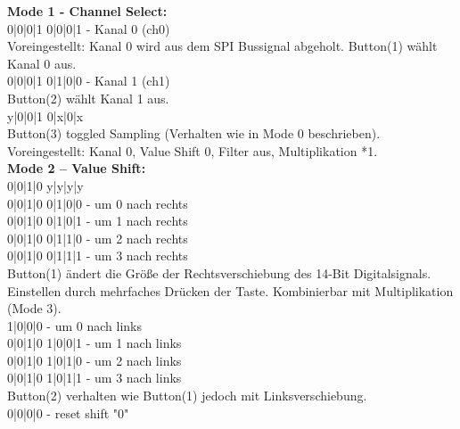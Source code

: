 \noindent \textbf{Mode 1 - Channel Select:}\\
{\color{red} 0}{\color{blue}|0|0|1} {\color{orange} 0|0|0|1} - Kanal 0 (ch0)\\
Voreingestellt: Kanal 0 wird aus dem SPI Bussignal abgeholt.
Button(1) wählt Kanal 0 aus.\\
{\color{red} 0}{\color{blue}|0|0|1} {\color{orange} 0|1|0|0} - Kanal 1 (ch1)\\
Button(2) wählt Kanal 1 aus.\\
{\color{red} y}{\color{blue}|0|0|1} {\color{orange} 0|x|0|x} \\
Button(3) toggled Sampling (Verhalten wie in Mode 0 beschrieben).
Voreingestellt: Kanal 0, Value Shift 0, Filter aus, Multiplikation *1.\\

\noindent \textbf{Mode 2 – Value Shift:}\\
{\color{red} 0}{\color{blue}|0|1|0} {\color{orange} y|y|y|y} 
\\ 
{\color{red} 0}{\color{blue}|0|1|0} {\color{orange} 0|1|0|0} - um 0 nach rechts\\
{\color{red} 0}{\color{blue}|0|1|0} {\color{orange} 0|1|0|1} - um 1 nach rechts\\
{\color{red} 0}{\color{blue}|0|1|0} {\color{orange} 0|1|1|0} - um 2 nach rechts\\
{\color{red} 0}{\color{blue}|0|1|0} {\color{orange} 0|1|1|1} - um 3 nach rechts\\

\noindent Button(1) ändert die Größe der Rechtsverschiebung des 14-Bit Digitalsignals. Einstellen durch mehrfaches Drücken der Taste.
Kombinierbar mit Multiplikation (Mode 3).\\

 {\color{orange} 1|0|0|0} - um 0 nach links\\
{\color{red} 0}{\color{blue}|0|1|0} {\color{orange} 1|0|0|1} - um 1 nach links\\
{\color{red} 0}{\color{blue}|0|1|0} {\color{orange} 1|0|1|0} - um 2 nach links\\
{\color{red} 0}{\color{blue}|0|1|0} {\color{orange} 1|0|1|1} - um 3 nach links\\

\noindent Button(2) verhalten wie Button(1) jedoch mit Linksverschiebung.\\

 {\color{orange} 0|0|0|0} - reset shift "0"\\

